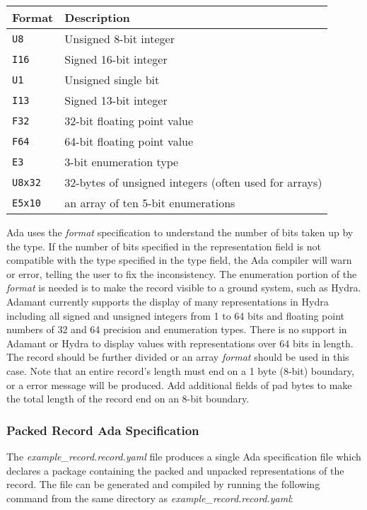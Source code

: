 \begin{xltabular}{\textwidth}{ | l | X | }
  \hline
  \textbf{Format} & \textbf{Description} \\ \hline
    \texttt{U8} & Unsigned 8-bit integer \\ \hline
    \texttt{I16} & Signed 16-bit integer \\ \hline
    \texttt{U1} & Unsigned single bit \\ \hline
    \texttt{I13} & Signed 13-bit integer \\ \hline
    \texttt{F32} & 32-bit floating point value \\ \hline
    \texttt{F64} & 64-bit floating point value \\ \hline
    \texttt{E3} & 3-bit enumeration type \\ \hline
    \texttt{U8x32} & 32-bytes of unsigned integers (often used for arrays) \\ \hline
    \texttt{E5x10} & an array of ten 5-bit enumerations \\ \hline
\end{xltabular}

Ada uses the \textit{format} specification to understand the number of bits taken up by the type. If the number of bits specified in the representation field is not compatible with the type specified in the type field, the Ada compiler will warn or error, telling the user to fix the inconsistency. The enumeration portion of the \textit{format} is needed is to make the record visible to a ground system, such as Hydra. Adamant currently supports the display of many representations in Hydra including all signed and unsigned integers from 1 to 64 bits and floating point numbers of 32 and 64 precision and enumeration types. There is no support in Adamant or Hydra to display values with representations over 64 bits in length. The record should be further divided or an array \textit{format} should be used in this case. Note that an entire record's length must end on a 1 byte (8-bit) boundary, or a error message will be produced. Add additional fields of pad bytes to make the total length of the record end on an 8-bit boundary.

\subsubsection{Packed Record Ada Specification} \label{Packed Record Ada Specification}

The \textit{example\_record.record.yaml} file produces a single Ada specification file which declares a package containing the packed and unpacked representations of the record. The file can be generated and compiled by running the following command from the same directory as \textit{example\_record.record.yaml}:

